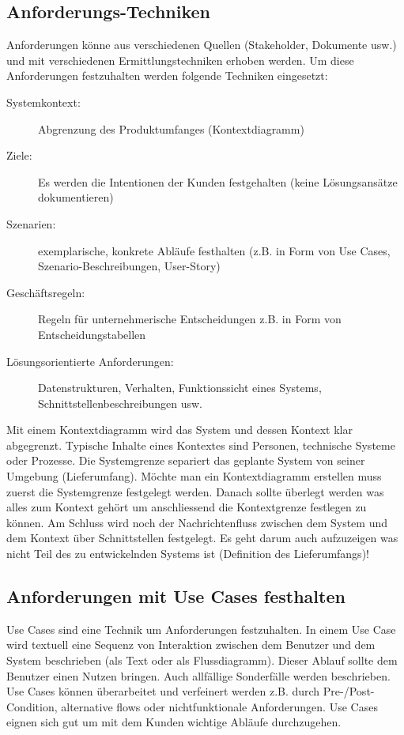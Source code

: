 \subsection{Anforderungs-Techniken}

Anforderungen könne aus verschiedenen Quellen (Stakeholder, Dokumente usw.) und mit verschiedenen Ermittlungstechniken erhoben werden. Um diese Anforderungen festzuhalten werden folgende Techniken eingesetzt:
\begin{description}
	\item[Systemkontext:] Abgrenzung des Produktumfanges (Kontextdiagramm)
	\item[Ziele:] Es werden die Intentionen der Kunden festgehalten (keine Lösungsansätze dokumentieren)
	\item[Szenarien:] exemplarische, konkrete Abläufe festhalten (z.B. in Form von Use Cases, Szenario-Beschreibungen, User-Story)
	\item[Geschäftsregeln:] Regeln für unternehmerische Entscheidungen z.B. in Form von Entscheidungstabellen
	\item[Lösungsorientierte Anforderungen:] Datenstrukturen, Verhalten, Funktionssicht eines Systems, Schnittstellenbeschreibungen usw.
\end{description}
Mit einem Kontextdiagramm wird das System und dessen Kontext klar abgegrenzt. Typische Inhalte eines Kontextes sind Personen, technische Systeme oder Prozesse. Die Systemgrenze separiert das geplante System von seiner Umgebung (Lieferumfang). Möchte man ein Kontextdiagramm erstellen muss zuerst die Systemgrenze festgelegt werden. Danach sollte überlegt werden was alles zum Kontext gehört um anschliessend die Kontextgrenze festlegen zu können. Am Schluss wird noch der Nachrichtenfluss zwischen dem System und dem Kontext über Schnittstellen festgelegt. Es geht darum auch aufzuzeigen was nicht Teil des zu entwickelnden Systems ist (Definition des Lieferumfangs)!

\subsection{Anforderungen mit Use Cases festhalten}

Use Cases sind eine Technik um Anforderungen festzuhalten. In einem Use Case wird textuell eine Sequenz von Interaktion zwischen dem Benutzer und dem System beschrieben (als Text oder als Flussdiagramm). Dieser Ablauf sollte dem Benutzer einen Nutzen bringen. Auch allfällige Sonderfälle werden beschrieben. Use Cases können überarbeitet und verfeinert werden z.B. durch Pre-/Post-Condition, alternative flows oder nichtfunktionale Anforderungen. Use Cases eignen sich gut um mit dem Kunden wichtige Abläufe durchzugehen.

